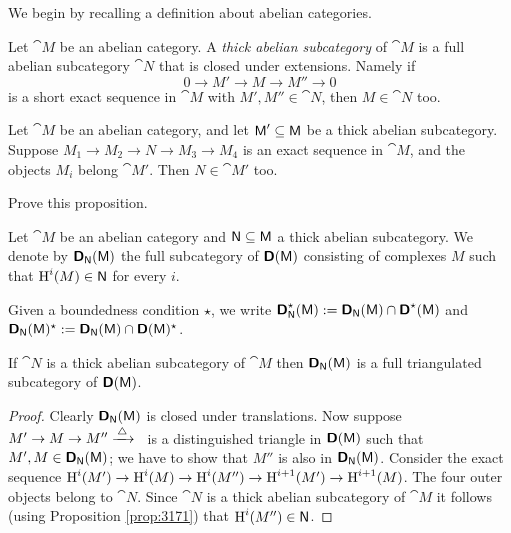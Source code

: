 \newpage
{}
\label{subsec:thick-subcats}

We begin by recalling a definition about abelian categories. 

\begin{dfn} \label{dfn:2323}
Let $\cat{M}$ be an abelian category. A 
{\em thick abelian subcategory}%
of $\cat{M}$ is a full abelian subcategory $\cat{N}$ that is closed under
extensions. Namely if 
\[ 0 \to M' \to M \to M'' \to 0 \]
is a short exact sequence in $\cat{M}$ with $M', M'' \in \cat{N}$, then 
$M \in \cat{N}$ too. 
\end{dfn}

\begin{prop} \label{prop:3171} 
Let $\cat{M}$ be an abelian category, and let $\operatorname{\mathsf{M}}' \subseteq \operatorname{\mathsf{M}}$ be a 
thick abelian subcategory. Suppose 
$M_1 \to M_2 \to N \to M_3 \to M_4$ 
is an exact sequence in $\cat{M}$, and the objects $M_i$ belong $\cat{M}'$. 
Then 
$N \in \cat{M}'$ too. 
\end{prop}

\begin{exer} \label{exer:2881}
Prove this proposition.
\end{exer}

\begin{dfn} \label{dfn:2321}
Let $\cat{M}$ be an abelian category and $\operatorname{\mathsf{N}} \subseteq \operatorname{\mathsf{M}}$ a thick abelian 
subcategory. We denote by $\boldsymbol{\mathsf{D}}_{\operatorname{\mathsf{N}}}(\operatorname{\mathsf{M}})$ 
the full subcategory of $\boldsymbol{\mathsf{D}}(\operatorname{\mathsf{M}})$
consisting of complexes $M$ such that 
$\operatorname{H}^i(M) \in \operatorname{\mathsf{N}}$ for every $i$. 

Given a boundedness condition $\star$, 
we write 
$\boldsymbol{\mathsf{D}}_{\operatorname{\mathsf{N}}}^{\star}(\operatorname{\mathsf{M}}) := 
\boldsymbol{\mathsf{D}}_{\operatorname{\mathsf{N}}}(\operatorname{\mathsf{M}}) \cap \boldsymbol{\mathsf{D}}^{\star}(\operatorname{\mathsf{M}})$
and
$\boldsymbol{\mathsf{D}}_{\operatorname{\mathsf{N}}}(\operatorname{\mathsf{M}})^{\star} := 
\boldsymbol{\mathsf{D}}_{\operatorname{\mathsf{N}}}(\operatorname{\mathsf{M}}) \cap \boldsymbol{\mathsf{D}}(\operatorname{\mathsf{M}})^{\star}$.
\end{dfn}

\begin{prop} \label{prop:3052}
If $\cat{N}$ is a thick abelian subcategory of $\cat{M}$ then
$\boldsymbol{\mathsf{D}}_{\operatorname{\mathsf{N}}}(\operatorname{\mathsf{M}})$ is a full triangulated subcategory of 
$\boldsymbol{\mathsf{D}}(\operatorname{\mathsf{M}})$.
\end{prop}

\begin{proof}
Clearly $\boldsymbol{\mathsf{D}}_{\operatorname{\mathsf{N}}}(\operatorname{\mathsf{M}})$ is closed under translations. 
Now suppose 
$M' \to M \to M'' \xrightarrow{\, \triangle\, }$ \, 
is a distinguished triangle in $\boldsymbol{\mathsf{D}}(\operatorname{\mathsf{M}})$ such that 
$M', M \in \boldsymbol{\mathsf{D}}_{\operatorname{\mathsf{N}}}(\operatorname{\mathsf{M}})$; we have to show that $M''$
is also in $\boldsymbol{\mathsf{D}}_{\operatorname{\mathsf{N}}}(\operatorname{\mathsf{M}})$.
Consider the  exact sequence 
$\operatorname{H}^i(M') \to \operatorname{H}^i(M) \to
\operatorname{H}^i(M'') \to \operatorname{H}^{i+1}(M') \to \operatorname{H}^{i+1}(M)$.
The four outer objects belong to $\cat{N}$. 
Since $\cat{N}$ is a thick abelian subcategory of $\cat{M}$ it follows (using 
Proposition \ref{prop:3171}) that 
$\operatorname{H}^i(M'') \in \operatorname{\mathsf{N}}$.
\end{proof}


